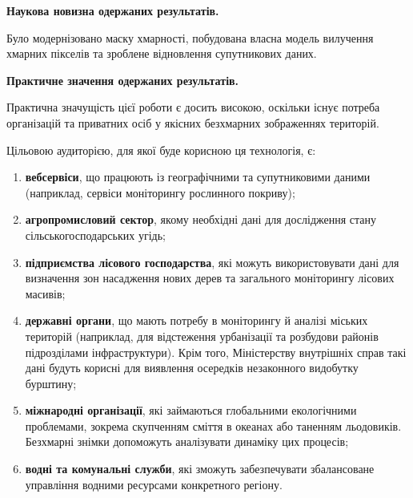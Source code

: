 \textbf{Наукова новизна одержаних результатів.}

Було модернізовано маску хмарності, побудована %
власна модель вилучення хмарних пікселів
та зроблене відновлення супутникових даних.

\textbf{Практичне значення одержаних результатів.}

Практична значущість цієї роботи є досить %
високою, оскільки існує потреба організацій та
приватних осіб у якісних безхмарних %
зображеннях територій.

Цільовою аудиторією, для якої буде корисною ця %
технологія, є:

\begin{enumerate}
	\item \textbf{вебсервіси}, що працюють із %
географічними та супутниковими даними
		(наприклад, сервіси моніторингу рослинного %
покриву);

	\item \textbf{агропромисловий сектор}, якому %
необхідні дані для дослідження
	стану
		сільськогосподарських угідь;

	\item \textbf{підприємства лісового господарства}, %
які можуть використовувати
	дані
		для визначення зон насадження нових дерев та %
загального моніторингу
		лісових масивів;

	\item \textbf{державні органи}, що мають потребу в %
моніторингу й аналізі міських
		територій (наприклад, для відстеження %
урбанізації та розбудови районів
		підрозділами інфраструктури).  Крім того, %
Міністерству внутрішніх справ
		такі дані будуть корисні для виявлення %
осередків незаконного видобутку
		бурштину;

	\item \textbf{міжнародні організації}, які %
займаються глобальними екологічними
		проблемами, зокрема скупченням сміття в %
океанах або таненням льодовиків.
		Безхмарні знімки допоможуть аналізувати %
динаміку цих процесів;

	\item \textbf{водні та комунальні служби}, які %
зможуть забезпечувати
	збалансоване
		управління водними ресурсами конкретного %
регіону.
\end{enumerate}
